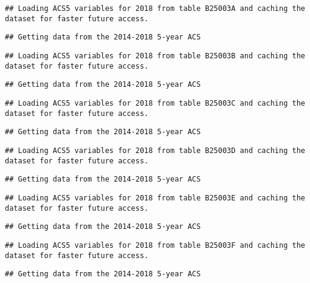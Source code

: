 \documentclass[]{article}
\begin{document}
\begin{verbatim}
## Loading ACS5 variables for 2018 from table B25003A and caching the dataset for faster future access.
\end{verbatim}

\begin{verbatim}
## Getting data from the 2014-2018 5-year ACS
\end{verbatim}

\begin{verbatim}
## Loading ACS5 variables for 2018 from table B25003B and caching the dataset for faster future access.
\end{verbatim}

\begin{verbatim}
## Getting data from the 2014-2018 5-year ACS
\end{verbatim}

\begin{verbatim}
## Loading ACS5 variables for 2018 from table B25003C and caching the dataset for faster future access.
\end{verbatim}

\begin{verbatim}
## Getting data from the 2014-2018 5-year ACS
\end{verbatim}

\begin{verbatim}
## Loading ACS5 variables for 2018 from table B25003D and caching the dataset for faster future access.
\end{verbatim}

\begin{verbatim}
## Getting data from the 2014-2018 5-year ACS
\end{verbatim}

\begin{verbatim}
## Loading ACS5 variables for 2018 from table B25003E and caching the dataset for faster future access.
\end{verbatim}

\begin{verbatim}
## Getting data from the 2014-2018 5-year ACS
\end{verbatim}

\begin{verbatim}
## Loading ACS5 variables for 2018 from table B25003F and caching the dataset for faster future access.
\end{verbatim}

\begin{verbatim}
## Getting data from the 2014-2018 5-year ACS
\end{verbatim}
\end{document}
